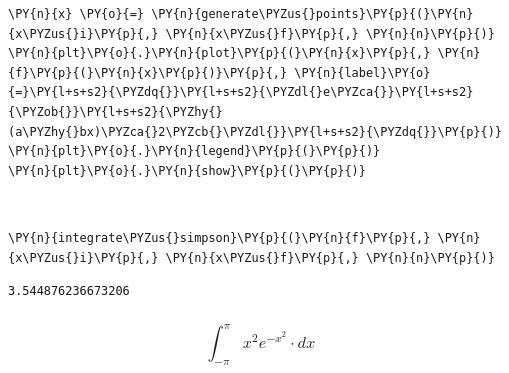     \begin{tcolorbox}[breakable, size=fbox, boxrule=1pt, pad at break*=1mm,colback=cellbackground, colframe=cellborder]
\begin{Verbatim}[commandchars=\\\{\}]
\PY{n}{x} \PY{o}{=} \PY{n}{generate\PYZus{}points}\PY{p}{(}\PY{n}{x\PYZus{}i}\PY{p}{,} \PY{n}{x\PYZus{}f}\PY{p}{,} \PY{n}{n}\PY{p}{)}
\PY{n}{plt}\PY{o}{.}\PY{n}{plot}\PY{p}{(}\PY{n}{x}\PY{p}{,} \PY{n}{f}\PY{p}{(}\PY{n}{x}\PY{p}{)}\PY{p}{,} \PY{n}{label}\PY{o}{=}\PY{l+s+s2}{\PYZdq{}}\PY{l+s+s2}{\PYZdl{}e\PYZca{}}\PY{l+s+s2}{\PYZob{}}\PY{l+s+s2}{\PYZhy{}(a\PYZhy{}bx)\PYZca{}2\PYZcb{}\PYZdl{}}\PY{l+s+s2}{\PYZdq{}}\PY{p}{)}
\PY{n}{plt}\PY{o}{.}\PY{n}{legend}\PY{p}{(}\PY{p}{)}
\PY{n}{plt}\PY{o}{.}\PY{n}{show}\PY{p}{(}\PY{p}{)}
\end{Verbatim}
\end{tcolorbox}

    \begin{center}
    \end{center}
    { \hspace*{\fill} \\}
    
    \begin{tcolorbox}[breakable, size=fbox, boxrule=1pt, pad at break*=1mm,colback=cellbackground, colframe=cellborder]
\begin{Verbatim}[commandchars=\\\{\}]
\PY{n}{integrate\PYZus{}simpson}\PY{p}{(}\PY{n}{f}\PY{p}{,} \PY{n}{x\PYZus{}i}\PY{p}{,} \PY{n}{x\PYZus{}f}\PY{p}{,} \PY{n}{n}\PY{p}{)}
\end{Verbatim}
\end{tcolorbox}

            \begin{tcolorbox}[breakable, size=fbox, boxrule=.5pt, pad at break*=1mm, opacityfill=0]
\begin{Verbatim}[commandchars=\\\{\}]
3.544876236673206
\end{Verbatim}
\end{tcolorbox}
        
    \hypertarget{int_-pipi-x2-e-x2-cdot-dx}{%
\subsubsection{\texorpdfstring{\[\int_{-\pi}^{\pi} x^2 e^{-x^2} \cdot dx\]}{\textbackslash int\_\{-\textbackslash pi\}\^{}\{\textbackslash pi\} x\^{}2 e\^{}\{-x\^{}2\} \textbackslash cdot dx}}\label{int_-pipi-x2-e-x2-cdot-dx}}

